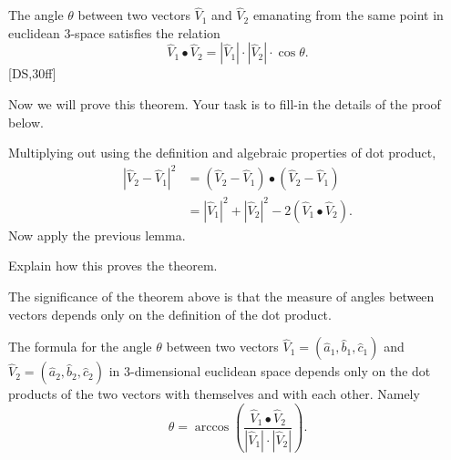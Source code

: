 \documentclass{ximera}
\begin{document}

\begin{theorem}
\label{111}The angle $\theta$ between two vectors $\hat{V}_{1}$ and
$\hat{V}_{2}$ emanating from the same point in euclidean $3$-space satisfies
the relation
\begin{equation}
\hat{V}_{1}\bullet\hat{V}_{2}=\left\vert \hat{V}_{1}\right\vert \cdot
\left\vert \hat{V}_{2}\right\vert \cdot\cos\theta. \label{2}%
\end{equation}
[DS,30ff]
\end{theorem}

Now we will prove this theorem. Your task is to fill-in the details of
the proof below.

\begin{problem}
Multiplying out using the definition and algebraic properties of dot product,%
\begin{align*}
\left\vert \hat{V}_{2}-\hat{V}_{1}\right\vert ^{2}  &  =\left(  \hat{V}%
_{2}-\hat{V}_{1}\right)  \bullet\left(  \hat{V}_{2}-\hat{V}_{1}\right) \\
&  =\left\vert \hat{V}_{1}\right\vert ^{2}+\left\vert \hat{V}_{2}\right\vert
^{2}-2\left(  \hat{V}_{1}\bullet\hat{V}_{2}\right)  .
\end{align*}
Now apply the previous lemma.

Explain how this proves the theorem. 
\end{problem}

The significance of the theorem above is that the measure of angles between
vectors depends only on the definition of the dot product.

\begin{corollary}
The formula for the angle $\theta$ between two vectors $\hat{V}_{1}=\left(
\hat{a}_{1},\hat{b}_{1},\hat{c}_{1}\right)  $ and $\hat{V}_{2}=\left(  \hat
{a}_{2},\hat{b}_{2},\hat{c}_{2}\right)  $ in $3$-dimensional euclidean space
depends only on the dot products of the two vectors with themselves and with
each other. Namely%
\[
\theta=\arccos\left(  \frac{\hat{V}_{1}\bullet\hat{V}_{2}%
}{\left\vert \hat{V}_{1}\right\vert \cdot\left\vert \hat{V}_{2}\right\vert
}\right)  .
\]

\end{corollary}
\end{document}
